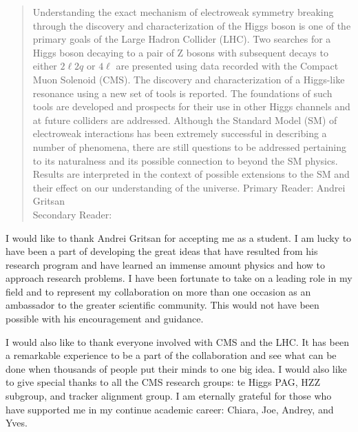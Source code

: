 \begin{frontmatter}

\maketitle

\begin{abstract}
Understanding the exact mechanism of electroweak symmetry breaking
through the discovery and characterization of the Higgs boson
is one of the primary goals of the Large Hadron Collider (LHC).
Two searches for a Higgs boson decaying to a pair of Z bosons
with subsequent decays to either $2\ell2q$ or $4\ell$ are 
presented using data
recorded with the Compact Muon Solenoid (CMS). 
The discovery and characterization of a Higgs-like resonance
using a new set of tools is reported.  
The foundations of 
such tools are developed and prospects for their use
in other Higgs channels and at future colliders are addressed.
Although the Standard
Model (SM) of electroweak interactions has been extremely
successful in describing a number of phenomena, there are still
questions to be addressed pertaining to its naturalness and its
possible connection to beyond the SM physics.  
Results are interpreted in the context of possible
extensions to the SM and their effect on our understanding of
the universe.
\vspace{.3cm}
\noindent Primary Reader: Andrei Gritsan\\
Secondary Reader:

\end{abstract}

\begin{acknowledgment}

I would like to thank Andrei Gritsan for accepting me as a student.
I am lucky to have been a part of developing the great ideas that
have resulted from his research program and have learned an 
immense amount physics and how to approach research problems.  
I have been fortunate to take on a leading role in
my field and to represent my collaboration on more than one 
occasion as an ambassador to the greater scientific community. 
This would not have been possible with his encouragement and
guidance.

I would also like to thank everyone involved with CMS and the
LHC.  It has been a remarkable experience to be 
a part of the collaboration and see what can be done when
thousands of people put their minds to one big idea.  
I would also like to give special thanks to all the 
CMS research groups: te Higgs PAG, HZZ subgroup, and tracker 
alignment group.  
I am eternally grateful for those who have supported me
in my continue academic career: Chiara, Joe, Andrey, and Yves. 


\end{acknowledgment}
\end{frontmatter}
